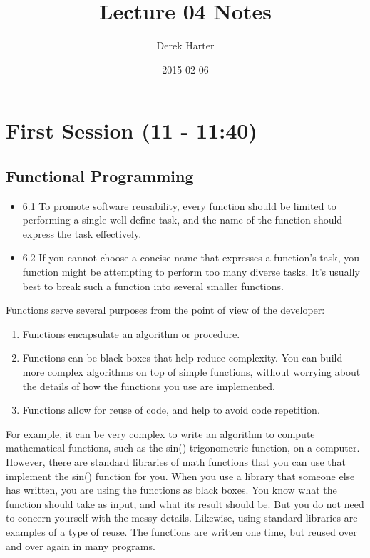 \documentclass[11pt]{article}
\title{Lecture 04 Notes}
\author{Derek Harter}
\date{2015-02-06}
\begin{document}
\maketitle


\section{First Session (11 - 11:40)}
\label{sec-1}
\subsection{Functional Programming}
\label{sec-1-1}

\begin{itemize}
\item 6.1 To promote software reusability, every function should be limited to performing a single
  well define task, and the name of the function should express the task effectively.
\item 6.2 If you cannot choose a concise name that expresses a function's task, you function might
  be attempting to perform too many diverse tasks.  It's usually best to break such a function
  into several smaller functions.
\end{itemize}

Functions serve several purposes from the point of view of the
developer:

\begin{enumerate}
\item Functions encapsulate an algorithm or procedure.
\item Functions can be black boxes that help reduce complexity.  You can
   build more complex algorithms on top of simple functions, without
   worrying about the details of how the functions you use are
   implemented.
\item Functions allow for reuse of code, and help to avoid code repetition.
\end{enumerate}

For example, it can be very complex to write an algorithm to compute
mathematical functions, such as the sin() trigonometric function, on a
computer.  However, there are standard libraries of math functions
that you can use that implement the sin() function for you.  When you
use a library that someone else has written, you are using the
functions as black boxes.  You know what the function should take as
input, and what its result should be.  But you do not need to concern
yourself with the messy details.  Likewise, using standard libraries
are examples of a type of reuse.  The functions are written one time,
but reused over and over again in many programs.
\end{document}
